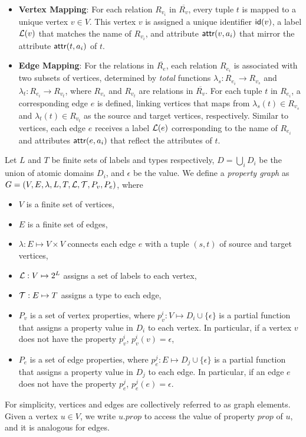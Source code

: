 \begin{itemize}
\item \textbf{Vertex Mapping}: For each relation \(R_{v_i}\) in \(\overline{R_v}\), every tuple \(t\) is mapped to a unique vertex \(v \in V\). This vertex \(v\) is assigned a unique identifier \({\mathsf{id}}(v)\), a label \(\mathcal{L}(v)\) that matches the name of \(R_{v_i}\), and attribute \({\mathsf{attr}}(v, a_i)\) that mirror the attribute \({\mathsf{attr}}(t, a_i)\) of \(t\).

\item \textbf{Edge Mapping}: For the relations in \(\overline{R_e}\), each relation \(R_{e_i}\) is associated with two subsets of vertices, determined by \emph{total} functions \(\lambda_s: R_{e_i} \to R_{v_s}\) and \(\lambda_t: R_{e_i} \to R_{v_t}\), where \(R_{v_s}\) and \(R_{v_t}\) are relations in \(\overline{R_v}\). For each tuple \(t\) in \(R_{e_i}\), a corresponding edge \(e\) is defined, linking vertices that \rgmapping maps from \(\lambda_s(t) \in R_{v_s}\) and \(\lambda_t(t) \in R_{v_t}\) as the source and target vertices, respectively. Similar to vertices, each edge \(e\) receives a label \(\mathcal{L}(e)\) corresponding to the name of \(R_{e_i}\) and attributes \({\mathsf{attr}}(e, a_i)\) that reflect the attributes of \(t\).

\end{itemize}


Let $L$ and $T$ be finite sets of labels and types respectively, $D = \bigcup_i D_i$ be the union of atomic domains $D_i$, and $\epsilon$ be the  value. We define a \textit{property graph} as $G = (V, E, \lambda, L, T, \mathcal{L}, \mathcal{T}, P_v, P_e)$, where
\begin{itemize}
    \item $V$ is a finite set of vertices,
    \item $E$ is a finite set of edges,
    \item $\lambda: E \mapsto V \times V$ connects each edge $e$ with a tuple $(s, t)$ of source and target vertices,
    \item $\mathcal{L}: V \mapsto 2^L$ assigns a set of labels to each vertex,
    \item $\mathcal{T}: E \mapsto T$ assigns a type to each edge,
    \item $P_v$ is a set of vertex properties, where $p_v^i: V \mapsto D_i \cup \{\epsilon\}$ is a partial function that assigns a property value in $D_i$ to each vertex.
    In particular, if a vertex $v$ does not have the property $p_v^i$, $p_v^i(v) = \epsilon$,
    \item $P_e$ is a set of edge properties, where $p_e^j: E \mapsto D_j \cup \{\epsilon\}$ is a partial function that assigns a property value in $D_j$ to each edge.
    In particular, if an edge $e$ does not have the property $p_e^j$, $p_e^j(e) = \epsilon$.
\end{itemize}
For simplicity, vertices and edges are collectively referred to as graph elements.
Given a vertex $u \in V$, we write $u.prop$ to access the value of property $prop$ of $u$, and it is analogous for edges.




